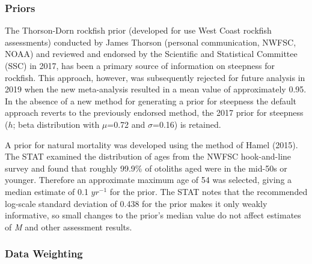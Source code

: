 \documentclass[11pt,
  english,
]{article}
\begin{document}

\hypertarget{priors}{%
\subsubsection{Priors}\label{priors}}

\leavevmode\tagmcend\tagstructend

The Thorson-Dorn rockfish prior (developed for use West Coast rockfish assessments) conducted by James Thorson (personal communication, NWFSC, NOAA) and reviewed and endorsed by the Scientific and Statistical Committee (SSC) in 2017, has been a primary source of information on steepness for rockfish. This approach, however, was subsequently rejected for future analysis in 2019 when the new meta-analysis resulted in a mean value of approximately 0.95. In the absence of a new method for generating a prior for steepness the default approach reverts to the previously endorsed method, the 2017 prior for steepness ({\(h\)\leavevmode\tagmcend\tagstructend}; beta distribution with {\(\mu\)\leavevmode\tagmcend\tagstructend}=0.72 and {\(\sigma\)\leavevmode\tagmcend\tagstructend}=0.16) is retained.

A prior for natural mortality was developed using the method of Hamel {(2015)\leavevmode\tagmcend\tagstructend}. The STAT examined the distribution of ages from the NWFSC hook-and-line survey and found that roughly 99.9\% of otoliths aged were in the mid-50s or younger. Therefore an approximate maximum age of 54 was selected, giving a median estimate of 0.1 {\(yr^{-1}\)\leavevmode\tagmcend\tagstructend} for the prior. The STAT notes that the recommended log-scale standard deviation of 0.438 for the prior makes it only weakly informative, so small changes to the prior's median value do not affect estimates of \emph{M} and other assessment results.


\hypertarget{data-weighting}{%
\subsubsection{Data Weighting}\label{data-weighting}}

\leavevmode\tagmcend\tagstructend
\end{document}
